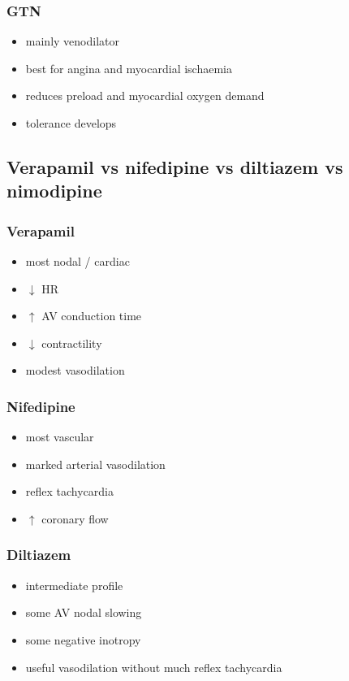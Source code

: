 \documentclass[11pt,a4paper]{article}
\begin{document}
\subsubsection*{GTN}
\begin{itemize}
    \item mainly venodilator
    \item best for angina and myocardial ischaemia
    \item reduces preload and myocardial oxygen demand
    \item tolerance develops
\end{itemize}

\subsection{Verapamil vs nifedipine vs diltiazem vs nimodipine}

\subsubsection*{Verapamil}
\begin{itemize}
    \item most nodal / cardiac
    \item $\downarrow$ HR
    \item $\uparrow$ AV conduction time
    \item $\downarrow$ contractility
    \item modest vasodilation
\end{itemize}

\subsubsection*{Nifedipine}
\begin{itemize}
    \item most vascular
    \item marked arterial vasodilation
    \item reflex tachycardia
    \item $\uparrow$ coronary flow
\end{itemize}

\subsubsection*{Diltiazem}
\begin{itemize}
    \item intermediate profile
    \item some AV nodal slowing
    \item some negative inotropy
    \item useful vasodilation without much reflex tachycardia
\end{itemize}
\end{document}
